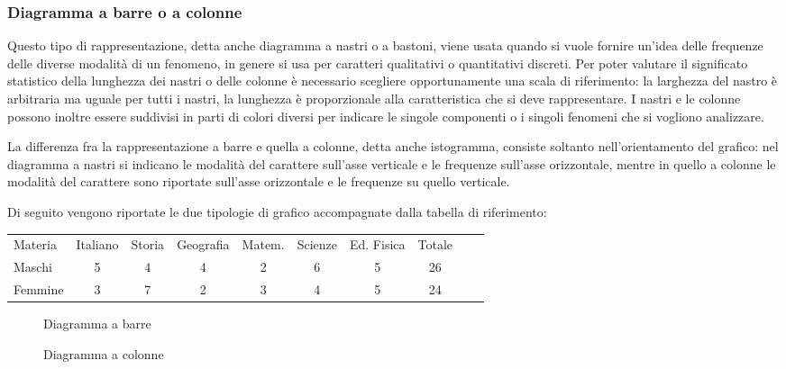 \subsubsection{Diagramma a barre o a colonne}
Questo tipo di rappresentazione, detta anche diagramma a nastri o a bastoni, viene usata quando si vuole fornire un'idea delle frequenze
delle diverse modalità di un fenomeno, in genere si usa per caratteri qualitativi o quantitativi discreti.
Per poter valutare il significato statistico della lunghezza dei nastri o delle colonne è necessario scegliere opportunamente una scala di riferimento:
la larghezza del nastro è arbitraria ma uguale per tutti i nastri, la lunghezza è proporzionale alla caratteristica che si deve rappresentare.
I nastri e le colonne possono inoltre essere suddivisi in parti di colori diversi per indicare le singole componenti o i singoli fenomeni
che si vogliono analizzare.

La differenza fra la rappresentazione a barre e quella a colonne, detta anche istogramma, consiste soltanto
nell'orientamento del grafico: nel diagramma a nastri si indicano le modalità del carattere sull'asse verticale e le frequenze sull'asse orizzontale,
mentre in quello a colonne le modalità del carattere sono riportate sull'asse
orizzontale e le frequenze su quello verticale.

Di seguito vengono riportate le due tipologie di grafico accompagnate dalla tabella di riferimento:
\begin{center}
 \begin{tabularx}{.95\textwidth}{X*{7}{c}Xc}
\toprule
Materia& Italiano &Storia & Geografia & Matem. & Scienze & Ed. Fisica & Totale\\
Maschi & 5 & 4& 4 & 2& 6 & 5& 26\\
Femmine & 3 & 7 & 2 & 3  & 4 & 5 & 24\\
\bottomrule
\end{tabularx}
\end{center}
\begin{center}
\begin{inaccessibleblock}
 \begin{figure}[t]

\caption{Diagramma a barre}
\end{figure}
\end{inaccessibleblock}
\end{center}

\begin{center}
 \begin{inaccessibleblock}
 \begin{figure}[!ht]

\caption{Diagramma a colonne}
\end{figure}
\end{inaccessibleblock}
\end{center}

